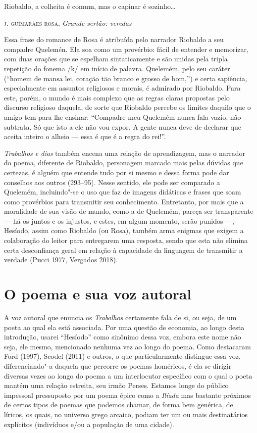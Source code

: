 
\epigraph{Riobaldo, a colheita é comum,
mas o capinar é sozinho\ldots{}}{\textsc{j. guimarães rosa}, \textit{Grande sertão: veredas}}


Essa frase do romance de Rosa é atribuída pelo narrador Riobaldo a seu
compadre Quelemén. Ela soa como um provérbio: fácil de entender e
memorizar, com duas orações que se espelham sintaticamente e são unidas
pela tripla repetição do fonema /k/ em início de palavra. Quelemém, pelo
seu caráter (``homem de mansa lei, coração tão branco e grosso de
bom,'') e certa sapiência, especialmente em assuntos religiosos e
morais, é admirado por Riobaldo. Para este, porém, o mundo é mais
complexo que as regras claras propostas pelo discurso religioso daquela,
de sorte que Riobaldo percebe os limites daquilo que o amigo tem para
lhe ensinar: ``Compadre meu Quelemém nunca fala vazio, não subtrata. Só
que isto a ele não vou expor. A gente nunca deve de declarar que aceita
inteiro o alheio --- essa é que é a regra do rei!''.

\emph{Trabalhos e dias} também encena uma relação de aprendizagem, mas o
narrador do poema, diferente de Riobaldo, personagem marcado mais pelas
dúvidas que certezas, é alguém que entende tudo por si mesmo e dessa
forma pode dar conselhos aos outros (293--95). Nesse sentido, ele pode
ser comparado a Quelemém, incluindo"-se o uso que faz de imagens
didáticas e frases que soam como provérbios para transmitir seu
conhecimento. Entretanto, por mais que a moralidade de sua visão de
mundo, como a de Quelemém, pareça ser transparente --- há os juntos e os
injustos, e estes, em algum momento, serão punidos ---, Hesíodo, assim
como Riobaldo (ou Rosa), também arma enigmas que exigem a colaboração do
leitor para entregarem uma resposta, sendo que esta não elimina certa
desconfiança geral em relação à capacidade da linguagem de transmitir a
verdade (Pucci 1977, Vergados 2018).

\section{O poema e sua voz autoral}


A voz autoral que enuncia os \emph{Trabalhos} certamente fala de si, ou
seja, de um poeta ao qual ela está associada. Por uma questão de
economia, ao longo desta introdução, usarei ``Hesíodo'' como sinônimo
dessa voz, embora este nome não seja, ele mesmo, mencionado nenhuma vez
ao longo do poema. Como destacaram Ford (1997), Scodel (2011) e outros,
o que particularmente distingue essa voz, diferenciando"-a daquela que
percorre os poemas homéricos, é ela se dirigir diversas vezes ao longo
do poema a um interlocutor específico com o qual o poeta mantém uma
relação estreita, seu irmão Perses. Estamos longe do público impessoal
pressuposto por um poema épico como a \emph{Ilíada} mas bastante
próximos de certos tipos de poemas que podemos chamar, de forma bem
genérica, de líricos, os quais, no universo grego arcaico, podiam ter um
ou mais destinatários explícitos (indivíduos e/ou a população de uma
cidade).

